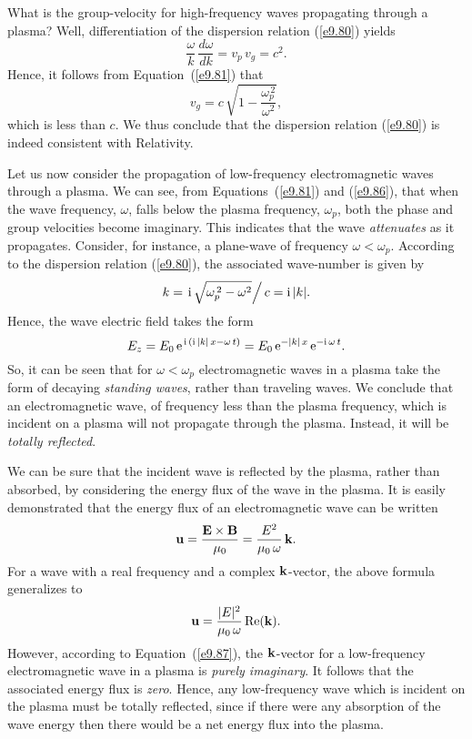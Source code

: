 What is the group-velocity for high-frequency waves propagating through a plasma?
Well, differentiation of the dispersion relation (\ref{e9.80}) yields
\begin{equation}
\frac{\omega}{k}\,\frac{d\omega}{dk} = v_p\,v_g= c^2.
\end{equation}
Hence, it follows from Equation~(\ref{e9.81}) that
\begin{equation}\label{e9.86}
v_g = c\,\sqrt{1-\frac{\omega_p^{\,2}}{\omega^2}},
\end{equation}
which is less than $c$. We thus conclude that the dispersion relation (\ref{e9.80})
is indeed consistent with Relativity.

Let us now consider the propagation of low-frequency electromagnetic waves through a plasma. We can see, from Equations~(\ref{e9.81}) and (\ref{e9.86}),
that when the wave frequency, $\omega$, falls below the plasma frequency,
$\omega_p$, both the phase and group velocities become imaginary.
This indicates that the wave {\em attenuates}\/ as it propagates. 
Consider, for instance, a plane-wave of frequency $\omega < \omega_p$.
According to the dispersion relation (\ref{e9.80}), the associated
wave-number is given by
\begin{equation}\label{e9.87}
k = \left.{\rm i}\,\sqrt{\omega_p^{\,2}-\omega^2}\right/c = {\rm i}\,|k|.
\end{equation}
Hence, the wave electric field takes the form
\begin{equation}
E_z = E_0\,{\rm e}^{\,{\rm i}\,({\rm  i}\,|k|\,x-\omega\,t)}
= E_0\,{\rm e}^{-|k|\,x}\,{\rm e}^{-{\rm i}\,\omega\,t}.
\end{equation}
So, it can be seen that for $\omega<\omega_p$ electromagnetic
waves in a plasma take the form of decaying {\em standing waves}, rather than
traveling waves. We conclude that an electromagnetic wave, of frequency
less than the plasma frequency, which is incident on a plasma
will not propagate through the plasma. Instead, it will be {\em totally
reflected}. 

We can be sure that the incident wave is reflected by the plasma, rather than absorbed,
 by considering the energy flux of the wave in the plasma.
It is easily demonstrated that the energy flux of an electromagnetic
wave can be written
\begin{equation}
{\bf u} = \frac{{\bf E}\times{\bf B}}{\mu_0} = \frac{E^2}{\mu_0\,\omega}\,{\bf k}.
\end{equation}
For a wave with a real frequency and a complex ${\bf k}$-vector, the
above formula generalizes to
\begin{equation}\label{e9power}
{\bf u} = \frac{|E|^2}{\mu_0\,\omega}\,{\rm Re}({\bf k}).
\end{equation}
However, according to Equation~(\ref{e9.87}), the ${\bf k}$-vector
for a low-frequency electromagnetic wave in a plasma is {\em purely
imaginary}. It follows that the associated energy flux is {\em zero}. 
Hence, any low-frequency wave which is incident on the plasma
must be totally reflected, since if there were any absorption of the wave
energy
 then there would be a net energy flux into the plasma.

